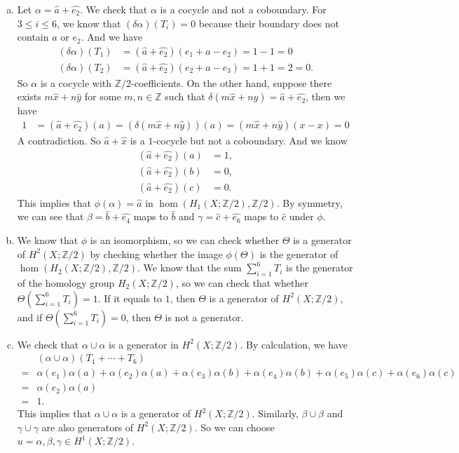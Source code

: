 \documentclass[letterpaper, 12pt]{article}
\begin{document}
\begin{solution}
\begin{enumerate}[(a)]
\item Let \(\alpha=\hat{a}+\hat{e_2}\). We check that \(\alpha\) is a cocycle and not a coboundary. For \(3\leq i\leq 6\), we know that \((\delta\alpha)(T_i)=0\) because their boundary does not contain \(a\) or \(e_2\). And we have 
\begin{align*}
    (\delta\alpha)(T_1)&=(\hat{a}+\hat{e_2})(e_1+a-e_2)=1-1=0\\ 
    (\delta\alpha)(T_2)&=(\hat{a}+\hat{e_2})(e_2+a-e_3)=1+1=2=0.
\end{align*}
So \(\alpha\) is a cocycle with \(\mathbb{Z}/2\)-coefficients. On the other hand, suppose there exists \(m\hat{x}+n\hat{y}\) for some \(m,n\in \mathbb{Z}\) such that \(\delta(m\hat{x}+n\hat{y})=\hat{a}+\hat{e_2}\), then we have 
\begin{align*}
   1&=(\hat{a}+\hat{e_2})(a)=(\delta(m\hat{x}+n\hat{y}))(a)=(m\hat{x}+n\hat{y})(x-x)=0
\end{align*}
A contradiction. So \(\hat{a}+\hat{x}\) is a \(1\)-cocycle but not a coboundary. And we know 
\begin{align*}
    (\hat{a}+\hat{e_2})(a)&=1,\\
    (\hat{a}+\hat{e_2})(b)&=0,\\
    (\hat{a}+\hat{e_2})(c)&=0. 
\end{align*}
This implies that \(\phi(\alpha)=\hat{a}\) in \(\hom(H_1(X;\mathbb{Z}/2),\mathbb{Z}/2)\). By symmetry, we can see that 
\(\beta=\hat{b}+\hat{e_4}\) maps to \(\hat{b}\) and \(\gamma=\hat{c}+\hat{e_6}\) maps to \(\hat{c}\) under \(\phi\).
\item We know that \(\phi\) is an isomorphism, so we can check whether \(\Theta\) is a generator of \(H^2(X;\mathbb{Z}/2)\) by checking whether the image \(\phi(\Theta)\) is the generator of \(\hom(H_2(X;\mathbb{Z}/2),\mathbb{Z}/2)\). We know that the sum \(\sum_{i=1}^{6}T_i\) is the generator of the homology group \(H_2(X;\mathbb{Z}/2)\), so we can check that whether \(\Theta(\sum_{i=1}^{6}T_i)=1\). If it equals to \(1\), then \(\Theta\) is a generator of \(H^2(X;\mathbb{Z}/2)\), and if \(\Theta(\sum_{i=1}^{6}T_i)=0\), then \(\Theta\) is not a generator.
\item We check that \(\alpha\cup \alpha\) is a generator in \(H^2(X;\mathbb{Z}/2)\). By calculation, we have 
\begin{align*}
    &(\alpha\cup \alpha)(T_1+\cdots+T_6)\\
   =&\alpha(e_1)\alpha(a)+\alpha(e_2)\alpha(a)+\alpha(e_3)\alpha(b)+\alpha(e_4)\alpha(b)+\alpha(e_5)\alpha(c)+\alpha(e_6)\alpha(c)\\ 
   =&\alpha(e_2)\alpha(a)\\ 
   =&1.
\end{align*}
This implies that \(\alpha\cup \alpha\) is a generator of \(H^2(X;\mathbb{Z}/2)\). Similarly, \(\beta\cup \beta\) and \(\gamma\cup \gamma\) are also generators of \(H^2(X;\mathbb{Z}/2)\). So we can choose \(u=\alpha, \beta, \gamma\in H^1(X;\mathbb{Z}/2)\). 
\end{enumerate}
\end{solution}
\end{document}
